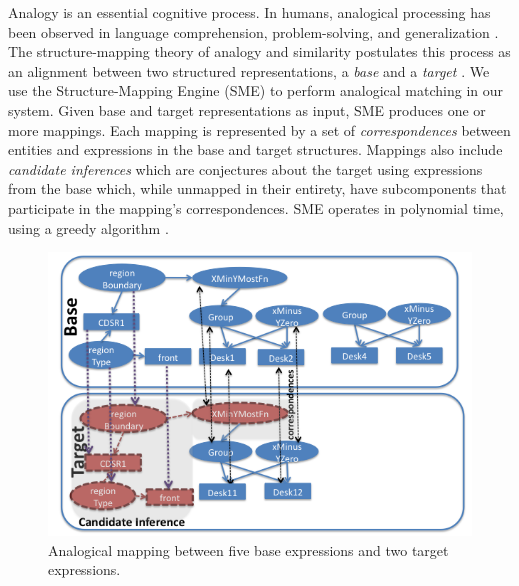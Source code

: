 \documentclass[letterpaper]{article}
\begin{document}
Analogy is an essential cognitive process. In humans, analogical processing has been observed in language comprehension, problem-solving, and generalization \cite{Gentner2003}. The structure-mapping theory of analogy and similarity postulates this process as an alignment between two structured representations, a \textit{base} and a \textit{target} \cite{Gentner1983a}. 
We use the Structure-Mapping Engine (SME) \cite{Falkenhainer1989a} to perform analogical matching in our system. Given base and target representations as input, SME produces one or more mappings. Each mapping is represented by a set of \textit{correspondences} between entities and expressions in the base and target structures.  Mappings also include \textit{candidate inferences} which are conjectures about the target using expressions from the base which, while unmapped in their entirety, have subcomponents that participate in the mapping's correspondences. SME operates in polynomial time, using a greedy algorithm \cite{Forbus/etal1994}.

\begin{figure}[h]
  \includegraphics[width=\columnwidth]{images/AnalogyDiagram.png}
  \caption{Analogical mapping between five base expressions and two target expressions. }
  
  \label{fig:analogy}
\end{figure}
\end{document}
